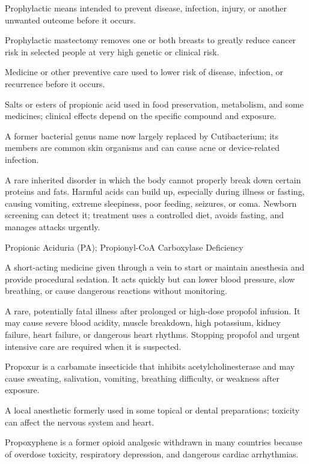  Prophylactic means intended to prevent disease, infection, injury, or another unwanted outcome before it occurs.

 Prophylactic mastectomy removes one or both breasts to greatly reduce cancer risk in selected people at very high genetic or clinical risk.

 Medicine or other preventive care used to lower risk of disease, infection, or recurrence before it occurs.

 Salts or esters of propionic acid used in food preservation, metabolism, and some medicines; clinical effects depend on the specific compound and exposure.

 A former bacterial genus name now largely replaced by Cutibacterium; its members are common skin organisms and can cause acne or device-related infection.

 A rare inherited disorder in which the body cannot properly break down certain proteins and fats. Harmful acids can build up, especially during illness or fasting, causing vomiting, extreme sleepiness, poor feeding, seizures, or coma. Newborn screening can detect it; treatment uses a controlled diet, avoids fasting, and manages attacks urgently.

\synonyms
Propionic Aciduria (PA); Propionyl-CoA Carboxylase Deficiency

 A short-acting medicine given through a vein to start or maintain anesthesia and provide procedural sedation. It acts quickly but can lower blood pressure, slow breathing, or cause dangerous reactions without monitoring.

 A rare, potentially fatal illness after prolonged or high-dose propofol infusion. It may cause severe blood acidity, muscle breakdown, high potassium, kidney failure, heart failure, or dangerous heart rhythms. Stopping propofol and urgent intensive care are required when it is suspected.

 Propoxur is a carbamate insecticide that inhibits acetylcholinesterase and may cause sweating, salivation, vomiting, breathing difficulty, or weakness after exposure.

 A local anesthetic formerly used in some topical or dental preparations; toxicity can affect the nervous system and heart.

 Propoxyphene is a former opioid analgesic withdrawn in many countries because of overdose toxicity, respiratory depression, and dangerous cardiac arrhythmias.


